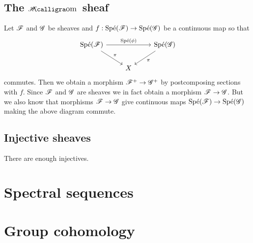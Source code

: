 \documentclass{memoir}
\begin{document}
\section{The $\sheafHom$ sheaf}
Let $\mathscr{F}$ and $\mathscr{G}$ be sheaves and $f:\text{Sp\'e}(\mathscr{F})\to \text{Sp\'e}(\mathscr{G})$ be a continuous map so that 
\begin{equation}
    \begin{tikzcd}
        \Spe(\shf{F}) \arrow[rr, "\Spe(\phi)"] \arrow[rd,"\pi"] & & \Spe(\shf{G}) \arrow[dl,"\pi"] \\
                                              & X &
    \end{tikzcd}
\end{equation}
commutes.
Then we obtain a morphism $\mathscr{F}^+\to\mathscr{G}^+$ by postcomposing sections with $f$.
Since $\mathscr{F}$ and $\mathscr{G}$ are sheaves we in fact obtain a morphism $\mathscr{F}\to\mathscr{G}$.
But we also know that morphisms $\mathscr{F}\to \mathscr{G}$ give continuous maps $\text{Sp\'e}(\mathscr{F})\to\text{Sp\'e}(\mathscr{G})$ making the above diagram commute.
\section{Injective sheaves}
There are enough injectives.
\chapter{Spectral sequences}

\chapter{Group cohomology}
\end{document}
